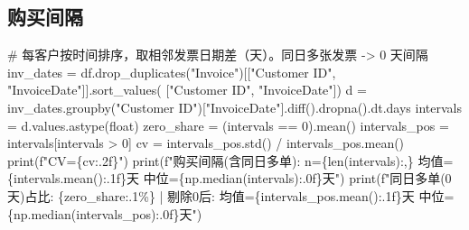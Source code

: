 \documentclass[
]{ctexart}
\newenvironment{Shaded}{\begin{snugshade}}{\end{snugshade}}
\newcommand{\BuiltInTok}[1]{\textcolor[rgb]{0.00,0.23,0.31}{#1}}
\newcommand{\CommentTok}[1]{\textcolor[rgb]{0.37,0.37,0.37}{#1}}
\newcommand{\DecValTok}[1]{\textcolor[rgb]{0.68,0.00,0.00}{#1}}
\newcommand{\NormalTok}[1]{\textcolor[rgb]{0.00,0.23,0.31}{#1}}
\newcommand{\OperatorTok}[1]{\textcolor[rgb]{0.37,0.37,0.37}{#1}}
\newcommand{\SpecialCharTok}[1]{\textcolor[rgb]{0.37,0.37,0.37}{#1}}
\newcommand{\SpecialStringTok}[1]{\textcolor[rgb]{0.13,0.47,0.30}{#1}}
\newcommand{\StringTok}[1]{\textcolor[rgb]{0.13,0.47,0.30}{#1}}
\begin{document}
\subsection{购买间隔}\label{ux8d2dux4e70ux95f4ux9694}

\begin{Shaded}
\begin{Highlighting}[]
\CommentTok{\# 每客户按时间排序，取相邻发票日期差（天）。同日多张发票 {-}\textgreater{} 0 天间隔}
\NormalTok{inv\_dates }\OperatorTok{=}\NormalTok{ df.drop\_duplicates(}\StringTok{"Invoice"}\NormalTok{)[[}\StringTok{"Customer ID"}\NormalTok{, }\StringTok{"InvoiceDate"}\NormalTok{]].sort\_values(}
\NormalTok{    [}\StringTok{"Customer ID"}\NormalTok{, }\StringTok{"InvoiceDate"}\NormalTok{])}
\NormalTok{d }\OperatorTok{=}\NormalTok{ inv\_dates.groupby(}\StringTok{"Customer ID"}\NormalTok{)[}\StringTok{"InvoiceDate"}\NormalTok{].diff().dropna().dt.days}
\NormalTok{intervals }\OperatorTok{=}\NormalTok{ d.values.astype(}\BuiltInTok{float}\NormalTok{)}
\NormalTok{zero\_share }\OperatorTok{=}\NormalTok{ (intervals }\OperatorTok{==} \DecValTok{0}\NormalTok{).mean()}
\NormalTok{intervals\_pos }\OperatorTok{=}\NormalTok{ intervals[intervals }\OperatorTok{\textgreater{}} \DecValTok{0}\NormalTok{]}
\NormalTok{cv }\OperatorTok{=}\NormalTok{ intervals\_pos.std() }\OperatorTok{/}\NormalTok{ intervals\_pos.mean()}
\BuiltInTok{print}\NormalTok{(}\SpecialStringTok{f"CV=}\SpecialCharTok{\{}\NormalTok{cv}\SpecialCharTok{:.2f\}}\SpecialStringTok{"}\NormalTok{)}
\BuiltInTok{print}\NormalTok{(}\SpecialStringTok{f"购买间隔(含同日多单): n=}\SpecialCharTok{\{}\BuiltInTok{len}\NormalTok{(intervals)}\SpecialCharTok{:,\}}\SpecialStringTok{ 均值=}\SpecialCharTok{\{}\NormalTok{intervals}\SpecialCharTok{.}\NormalTok{mean()}\SpecialCharTok{:.1f\}}\SpecialStringTok{天 中位=}\SpecialCharTok{\{}\NormalTok{np}\SpecialCharTok{.}\NormalTok{median(intervals)}\SpecialCharTok{:.0f\}}\SpecialStringTok{天"}\NormalTok{)}
\BuiltInTok{print}\NormalTok{(}\SpecialStringTok{f"同日多单(0天)占比: }\SpecialCharTok{\{}\NormalTok{zero\_share}\SpecialCharTok{:.1\%\}}\SpecialStringTok{ | 剔除0后: 均值=}\SpecialCharTok{\{}\NormalTok{intervals\_pos}\SpecialCharTok{.}\NormalTok{mean()}\SpecialCharTok{:.1f\}}\SpecialStringTok{天 中位=}\SpecialCharTok{\{}\NormalTok{np}\SpecialCharTok{.}\NormalTok{median(intervals\_pos)}\SpecialCharTok{:.0f\}}\SpecialStringTok{天"}\NormalTok{)}



\end{Highlighting}
\end{Shaded}
\end{document}
